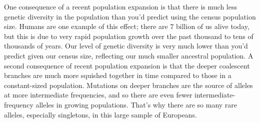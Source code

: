 One consequence of a recent population expansion is that there is much less genetic diversity in the population than you'd predict using the census
population size. Humans are one example of this effect; there are $7$ billion
of us alive today, but this is due to very rapid population growth
over the past thousand to tens of thousands of years. Our level of
genetic diversity is very much lower than you'd predict given our
census size, reflecting our much smaller ancestral population. A second consequence of recent population expansion is that the deeper coalescent branches are much more squished together in time compared to those in a constant-sized population.  Mutations on deeper branches are the source of alleles at more intermediate frequencies, and so there are even fewer intermediate-frequency alleles
in growing populations. That's why there are so many rare alleles,
especially singletons, in this large sample of Europeans.


